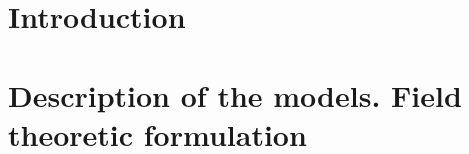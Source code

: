 \documentclass[12pt]{article}
\begin{document}
\title[] {}



\begin{abstract}

\end{abstract}



\maketitle

\section{Introduction} \label{sec:Intro}



\section{Description of the models. Field theoretic formulation}
\label{sec:QFT}
\end{document}
